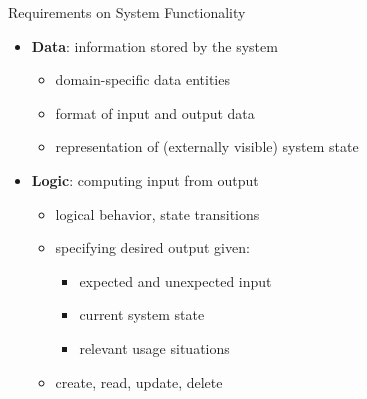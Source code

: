 \documentclass{beamer}
\begin{document}
\begin{frame}[fragile]{Requirements on System Functionality}
\begin{minipage}[t]{0.7\textwidth}
\vspace{0pt}
\begin{itemize}
\item \textbf{Data}: information stored by the system 
\begin{itemize}
\item domain-specific data entities
\item format of input and output data
\item representation of (externally visible) system state
\end{itemize}
\item \textbf{Logic}: computing input from output 
\begin{itemize}
\item logical behavior, state transitions
\item specifying desired output given:
\begin{itemize}
  \item expected and unexpected input
  \item current system state
  \item relevant usage situations
\end{itemize}
\item create, read, update, delete
\end{itemize}
\end{itemize}
\end{minipage}%
\begin{minipage}[t]{0.3\textwidth}
\vspace{0pt}

\end{minipage}
\end{frame}
\end{document}
